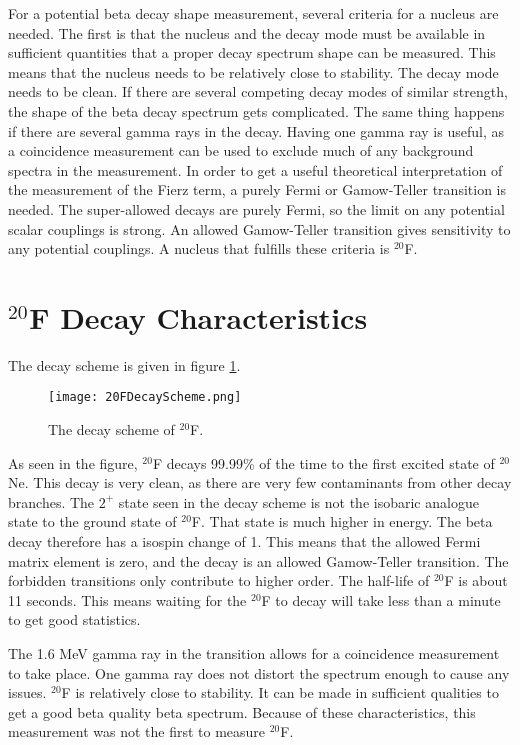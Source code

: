 \documentclass[main.tex]{subfiles}
\begin{document}
For a potential beta decay shape measurement, several criteria for a nucleus are needed.
The first is that the nucleus and the decay mode must be available in sufficient quantities that a proper decay spectrum shape can be measured.
This means that the nucleus needs to be relatively close to stability.
The decay mode needs to be clean.
If there are several competing decay modes of similar strength, the shape of the beta decay spectrum gets complicated.
The same thing happens if there are several gamma rays in the decay. 
Having one gamma ray is useful, as a coincidence measurement can be used to exclude much of any background spectra in the measurement.
In order to get a useful theoretical interpretation of the measurement of the Fierz term, a purely Fermi or Gamow-Teller transition is needed.
The super-allowed decays are purely Fermi, so the limit on any potential scalar couplings is strong.
An allowed Gamow-Teller transition gives sensitivity to any potential couplings. 
A nucleus that fulfills these criteria is $^{20}$F. 
 
\section{$^{20}$F Decay Characteristics}
The decay scheme is given in figure \ref{fig:DecayScheme}.

\begin{figure}[!htb]
	\centerline{\texttt{[image: 20FDecayScheme.png]}}
	\caption{The decay scheme of $^{20}$F.}
	\label{fig:DecayScheme}
\end{figure}

As seen in the figure, $^{20}$F decays 99.99\% of the time to the first excited state of $^{20}$Ne.
This decay is very clean, as there are very few contaminants from other decay branches. 
The $2^{+}$ state seen in the decay scheme is not the isobaric analogue state to the ground state of $^{20}$F.
That state is much higher in energy.
The beta decay therefore has a isospin change of 1.
This means that the allowed Fermi matrix element is zero, and the decay is an allowed Gamow-Teller transition. 
The forbidden transitions only contribute to higher order.
The half-life of $^{20}$F is about 11 seconds. 
This means waiting for the $^{20}$F to decay will take less than a minute to get good statistics.

The 1.6 MeV gamma ray in the transition allows for a coincidence measurement to take place.
One gamma ray does not distort the spectrum enough to cause any issues.
$^{20}$F is relatively close to stability. 
It can be made in sufficient qualities to get a good beta quality beta spectrum.
Because of these characteristics, this measurement was not the first to measure $^{20}$F.
\end{document}
